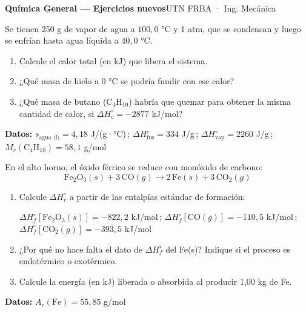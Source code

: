 \documentclass[11pt]{article}
\newcommand{\ejercicio}[1]{\par\vspace{10pt}{\large\bfseries\color{NavyBlue}Ejercicio #1}\par
  \nointerlineskip\vspace{2pt}{\color{NavyBlue!40}\rule{\linewidth}{0.4pt}}\par\vspace{2pt}}
\begin{document}
{\LARGE\bfseries Química General — Ejercicios nuevos}\hfill{\small UTN FRBA · Ing. Mecánica}\par
\vspace{2pt}{\color{NavyBlue}\rule{\linewidth}{0.8pt}}\par

\ejercicio{1}
Se tienen 250 g de vapor de agua a \(100{,}0\) °C y 1 atm, que se condensan y luego se enfrían hasta agua líquida a \(40{,}0\) °C.
\begin{enumerate}
\item Calcule el calor total (en kJ) que libera el sistema.
\item ¿Qué masa de hielo a 0 °C se podría fundir con ese calor?
\item ¿Qué masa de butano (C\(_4\)H\(_{10}\)) habría que quemar para obtener la misma cantidad de calor, si \(\Delta H^\circ_c = -2877\) kJ/mol?
\end{enumerate}
\begin{datos}
\textbf{Datos:} \(s_{\text{agua (l)}} = 4{,}18\) J/(g·°C)\,; \(\Delta H^\circ_{\text{fus}} = 334\) J/g\,; \(\Delta H^\circ_{\text{vap}} = 2260\) J/g\,; \(M_r(\text{C}_4\text{H}_{10}) = 58{,}1\) g/mol
\end{datos}

\ejercicio{2}
En el alto horno, el óxido férrico se reduce con monóxido de carbono:
\[\text{Fe}_2\text{O}_3(s) + 3\,\text{CO}(g) \rightarrow 2\,\text{Fe}(s) + 3\,\text{CO}_2(g)\]
\begin{enumerate}
\item Calcule \(\Delta H^\circ_r\) a partir de las entalpías estándar de formación:\par
{\raggedright\(\Delta H^\circ_f[\text{Fe}_2\text{O}_3(s)] = -822{,}2\) kJ/mol\,; \(\Delta H^\circ_f[\text{CO}(g)] = -110{,}5\) kJ/mol\,;\\ \(\Delta H^\circ_f[\text{CO}_2(g)] = -393{,}5\) kJ/mol\par}
\item ¿Por qué no hace falta el dato de \(\Delta H^\circ_f\) del Fe(s)? Indique si el proceso es endotérmico o exotérmico.
\item Calcule la energía (en kJ) liberada o absorbida al producir 1,00 kg de Fe.
\end{enumerate}
\begin{datos}
\textbf{Datos:} \(A_r(\text{Fe}) = 55{,}85\) g/mol
\end{datos}
\end{document}
